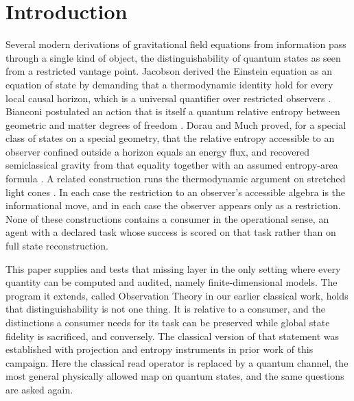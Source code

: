 \documentclass[aps,prd,reprint,nofootinbib,longbibliography]{revtex4-2}
\begin{document}
\maketitle

\section{Introduction}
\label{sec:intro}

Several modern derivations of gravitational field equations from information
pass through a single kind of object, the distinguishability of quantum
states as seen from a restricted vantage point.  Jacobson derived the
Einstein equation as an equation of state by demanding that a thermodynamic
identity hold for every local causal horizon, which is a universal
quantifier over restricted observers \cite{Jacobson1995}.  Bianconi
postulated an action that is itself a quantum relative entropy between
geometric and matter degrees of freedom \cite{Bianconi2025}.  Dorau and Much
proved, for a special class of states on a special geometry, that the
relative entropy accessible to an observer confined outside a horizon equals
an energy flux, and recovered semiclassical gravity from that equality
together with an assumed entropy-area formula \cite{DorauMuch2026}.  A
related construction runs the thermodynamic argument on stretched light
cones \cite{AlonsoSerrano2025}.  In each case the restriction to an
observer's accessible algebra is the informational move, and in each case
the observer appears only as a restriction.  None of these constructions
contains a consumer in the operational sense, an agent with a declared task
whose success is scored on that task rather than on full state
reconstruction.

This paper supplies and tests that missing layer in the only setting where
every quantity can be computed and audited, namely finite-dimensional
models.  The program it extends, called Observation Theory in our earlier
classical work, holds that distinguishability is not one thing.  It is
relative to a consumer, and the distinctions a consumer needs for its task
can be preserved while global state fidelity is sacrificed, and conversely.
The classical version of that statement was established with projection and
entropy instruments in prior work of this campaign.  Here the classical read
operator is replaced by a quantum channel, the most general physically
allowed map on quantum states, and the same questions are asked again.
\end{document}
